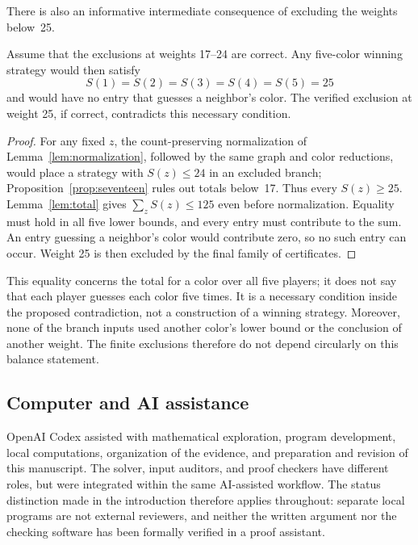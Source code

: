 There is also an informative intermediate consequence of excluding the
weights below~25.
\begin{corollary}\label{cor:balance}
Assume that the exclusions at weights 17--24 are correct. Any five-color
winning strategy would then satisfy
\[
S(1)=S(2)=S(3)=S(4)=S(5)=25
\]
and would have no entry that guesses a neighbor's color. The verified
exclusion at weight 25, if correct, contradicts this necessary condition.
\end{corollary}
\begin{proof}
For any fixed $z$, the count-preserving normalization of
Lemma~\ref{lem:normalization}, followed by the same graph and color
reductions, would place a strategy with $S(z)\leq24$ in an excluded branch;
Proposition~\ref{prop:seventeen} rules out totals below~17. Thus every
$S(z)\geq25$. Lemma~\ref{lem:total} gives $\sum_zS(z)\leq125$ even before
normalization. Equality must hold in all five lower bounds, and every
entry must contribute to the sum. An entry guessing a neighbor's color
would contribute zero, so no such entry can occur. Weight 25 is then
excluded by the final family of certificates.
\end{proof}

This equality concerns the total for a color over all five players; it
does not say that each player guesses each color five times. It is a
necessary condition inside the proposed contradiction, not a construction
of a winning strategy. Moreover, none of the branch inputs used another
color's lower bound or the conclusion of another weight. The finite
exclusions therefore do not depend circularly on this balance statement.

\subsection*{Computer and AI assistance}
OpenAI Codex assisted with mathematical exploration, program development,
local computations, organization of the evidence, and preparation and
revision of this manuscript. The solver, input auditors, and proof
checkers have different roles, but were integrated within the same
AI-assisted workflow. The status distinction made in the introduction
therefore applies throughout: separate local programs are not external
reviewers, and neither the written argument nor the checking software has
been formally verified in a proof assistant.

